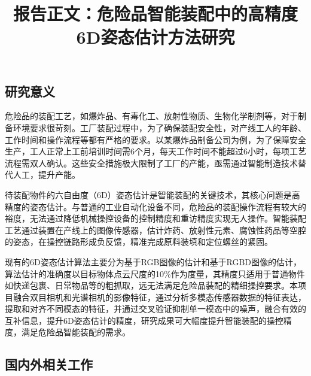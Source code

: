 \documentclass[12pt]{article}
\begin{document}

\title{报告正文：危险品智能装配中的高精度6D姿态估计方法研究}

\maketitle




\subsection{研究意义}

危险品的装配工艺，如爆炸品、有毒化工、放射性物质、生物化学制剂等，对于制备环境要求很苛刻。工厂装配过程中，为了确保装配安全性，对产线工人的年龄、工作时间和操作流程等都有严格的要求。以某爆炸品制备公司为例，为了保障安全生产，工人正常上工前培训时间需6个月，每天工作时间不能超过6小时，每项工艺流程需双人确认。这些安全措施极大限制了工厂的产能，亟需通过智能制造技术替代人工，提升产能。

待装配物件的六自由度（6D）姿态估计是智能装配的关键技术，其核心问题是高精度的姿态估计。与普通的工业自动化设备不同，危险品的装配操作流程有较大的裕度，无法通过降低机械操控设备的控制精度和重访精度实现无人操作。智能装配工艺通过装置在产线上的图像传感器，估计炸药、放射性元素、腐蚀性药品等空腔的姿态，在操控链路形成负反馈，精准完成原料装填和定位螺丝的紧固。

现有的6D姿态估计算法主要分为基于RGB图像的估计和基于RGBD图像的估计，算法估计的准确度以目标物体点云尺度的10\%作为度量，其精度只适用于普通物件如快递包裹、日常物品等的粗抓取，远无法满足危险品装配的精细操控要求。本项目融合双目相机和光谱相机的影像特征，通过分析多模态传感器数据的特征表达，提取和对齐不同模态的特征，并通过交叉验证抑制单一模态中的噪声，融合有效的互补信息，提升6D姿态估计的精度，研究成果可大幅度提升智能装配的操控精度，满足危险品智能装配的需求。

\subsection{国内外相关工作}
\end{document}
